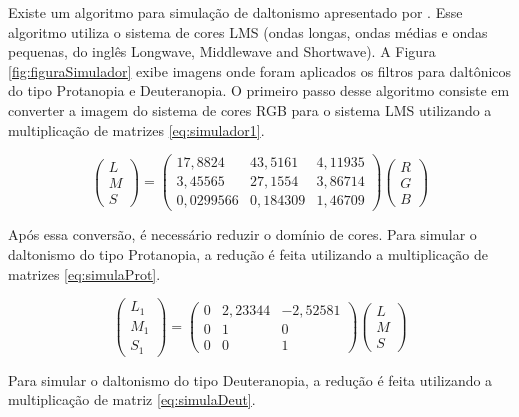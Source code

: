 \documentclass[	12pt, Times, openright, twoside, a4paper, english, brazil]{abntex2}
\begin{document}
Existe um algoritmo para simulação de daltonismo apresentado por . Esse algoritmo utiliza o sistema de cores LMS (ondas longas, ondas médias e ondas pequenas, do inglês Longwave, Middlewave and Shortwave). A Figura \ref{fig:figuraSimulador} exibe imagens onde foram aplicados os filtros para daltônicos do tipo Protanopia e Deuteranopia. O primeiro passo desse algoritmo consiste em converter a imagem do sistema de cores RGB para o sistema LMS utilizando a multiplicação de matrizes \ref{eq:simulador1}.

\begin{equation}
\left(\begin{array}{ccc}
L\\M\\S
\end{array}\right)
=
\left(\begin{array}{ccc}
17,8824 & 43,5161 & 4,11935 \\
3,45565 & 27,1554 & 3,86714 \\
0,0299566 & 0,184309 & 1,46709
\end{array}\right)
\left(\begin{array}{ccc}
R\\G\\B
\end{array}\right)
\label{eq:simulador1}
\end{equation}

Após essa conversão, é necessário reduzir o domínio de cores. Para simular o daltonismo do tipo Protanopia, a redução é feita utilizando a multiplicação de matrizes \ref{eq:simulaProt}.

\begin{equation}
\left(\begin{array}{ccc}
L_1\\M_1\\S_1
\end{array}\right)
=
\left(\begin{array}{ccc}
0 & 2,23344 & -2,52581 \\
0 & 1 & 0 \\
0 & 0 & 1
\end{array}\right)
\left(\begin{array}{ccc}
L\\M\\S
\end{array}\right)
\label{eq:simulaProt}
\end{equation}

Para simular o daltonismo do tipo Deuteranopia, a redução é feita utilizando a multiplicação de matriz \ref{eq:simulaDeut}.
\end{document}
